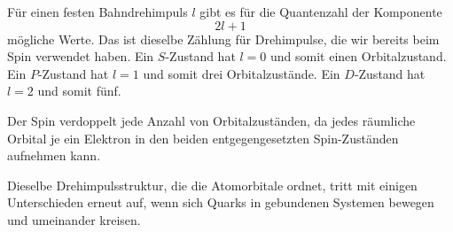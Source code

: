 \begin{classroomqa}
\end{classroomqa}

Für einen festen Bahndrehimpuls \(l\) gibt es für die Quantenzahl der Komponente
\begin{equation}
2l+1
\end{equation}
mögliche Werte. Das ist dieselbe Zählung für Drehimpulse, die wir bereits beim Spin verwendet haben. Ein \(S\)-Zustand hat \(l=0\) und somit einen Orbitalzustand. Ein \(P\)-Zustand hat \(l=1\) und somit drei Orbitalzustände. Ein \(D\)-Zustand hat \(l=2\) und somit fünf.

Der Spin verdoppelt jede Anzahl von Orbitalzuständen, da jedes räumliche Orbital je ein Elektron in den beiden entgegengesetzten Spin-Zuständen aufnehmen kann.

\begin{classroomqa}
\end{classroomqa}

Dieselbe Drehimpulsstruktur, die die Atomorbitale ordnet, tritt mit einigen Unterschieden erneut auf, wenn sich Quarks in gebundenen Systemen bewegen und umeinander kreisen.
